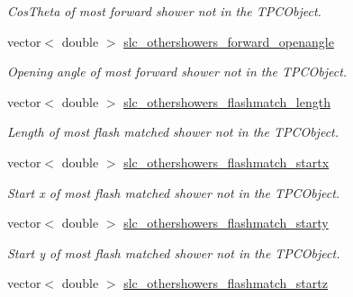 \begin{DoxyCompactItemize}
\begin{DoxyCompactList}\small\item\em Cos\-Theta of most forward shower not in the T\-P\-C\-Object. \end{DoxyCompactList}\item 
\hypertarget{classUBXSecEvent_aa32fe9b6345e01ef27de5bdd173ee1e2}{vector$<$ double $>$ \hyperlink{classUBXSecEvent_aa32fe9b6345e01ef27de5bdd173ee1e2}{slc\-\_\-othershowers\-\_\-forward\-\_\-openangle}}\label{classUBXSecEvent_aa32fe9b6345e01ef27de5bdd173ee1e2}

\begin{DoxyCompactList}\small\item\em Opening angle of most forward shower not in the T\-P\-C\-Object. \end{DoxyCompactList}\item 
\hypertarget{classUBXSecEvent_a933fe9543d4376ae6c6dde9177724648}{vector$<$ double $>$ \hyperlink{classUBXSecEvent_a933fe9543d4376ae6c6dde9177724648}{slc\-\_\-othershowers\-\_\-flashmatch\-\_\-length}}\label{classUBXSecEvent_a933fe9543d4376ae6c6dde9177724648}

\begin{DoxyCompactList}\small\item\em Length of most flash matched shower not in the T\-P\-C\-Object. \end{DoxyCompactList}\item 
\hypertarget{classUBXSecEvent_a4bdafa4c1c48aec36f61c84b9bc6260b}{vector$<$ double $>$ \hyperlink{classUBXSecEvent_a4bdafa4c1c48aec36f61c84b9bc6260b}{slc\-\_\-othershowers\-\_\-flashmatch\-\_\-startx}}\label{classUBXSecEvent_a4bdafa4c1c48aec36f61c84b9bc6260b}

\begin{DoxyCompactList}\small\item\em Start x of most flash matched shower not in the T\-P\-C\-Object. \end{DoxyCompactList}\item 
\hypertarget{classUBXSecEvent_a074df868594e6f1d0ad7ee5557203a8a}{vector$<$ double $>$ \hyperlink{classUBXSecEvent_a074df868594e6f1d0ad7ee5557203a8a}{slc\-\_\-othershowers\-\_\-flashmatch\-\_\-starty}}\label{classUBXSecEvent_a074df868594e6f1d0ad7ee5557203a8a}

\begin{DoxyCompactList}\small\item\em Start y of most flash matched shower not in the T\-P\-C\-Object. \end{DoxyCompactList}\item 
\hypertarget{classUBXSecEvent_adcfffc2605d88cf7ca7e6f76f428b809}{vector$<$ double $>$ \hyperlink{classUBXSecEvent_adcfffc2605d88cf7ca7e6f76f428b809}{slc\-\_\-othershowers\-\_\-flashmatch\-\_\-startz}}\label{classUBXSecEvent_adcfffc2605d88cf7ca7e6f76f428b809}


\end{DoxyCompactItemize}
